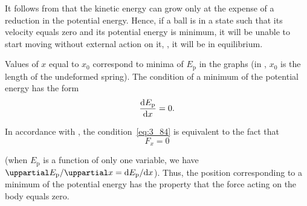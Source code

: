 \noindent
It follows from  that the kinetic energy can grow only at the expense of a reduction in the potential energy. Hence, if a ball is in a state such that its velocity equals zero and its potential energy is minimum, it will be unable to start moving without external action on it, \ie, it will be in equilibrium.

Values of $x$ equal to $x_0$ correspond to minima of $E_{\text{p}}$ in the graphs (in , $x_0$ is the length of the undeformed spring). The condition of a minimum of the potential energy has the form
\begin{equation}\label{eq:3_84}
\frac{\mathrm{d} E_{\text{p}}}{\mathrm{d} x} = 0.
\end{equation}

\noindent
In accordance with , the condition~\eqref{eq:3_84} is equivalent to the fact that
\begin{equation}\label{eq:3_85}
F_x = 0
\end{equation}

\noindent
(when $E_{\text{p}}$ is a function of only one variable, we have $\diffinpartial{E_{\text{p}}}{x}=\diffin{E_{\text{p}}}{x}$). Thus, the position corresponding to a minimum of the potential energy has the property that the force acting on the body equals zero.

